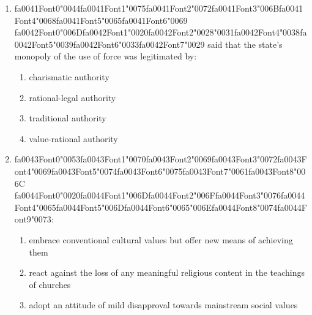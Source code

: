 \documentclass[12pt]{article}
\begin{document}
\begin{enumerate}[label=\arabic*.]
\begin{enumerate}[label=(\alph*)]
    \item the upward curve of remarriages compensates for the drop in first marriages
    \item all of the above
\end{enumerate}
\item {\csname fa0041Font0\endcsname\char"0044}{\csname fa0041Font1\endcsname\char"0075}{\csname fa0041Font2\endcsname\char"0072}{\csname fa0041Font3\endcsname\char"006B}{\csname fa0041Font4\endcsname\char"0068}{\csname fa0041Font5\endcsname\char"0065}{\csname fa0041Font6\endcsname\char"0069} {\csname fa0042Font0\endcsname\char"006D}{\csname fa0042Font1\endcsname\char"0020}{\csname fa0042Font2\endcsname\char"0028}{\char"0031}{\csname fa0042Font4\endcsname\char"0038}{\csname fa0042Font5\endcsname\char"0039}{\csname fa0042Font6\endcsname\char"0033}{\csname fa0042Font7\endcsname\char"0029} said that the state's monopoly of the use of force was legitimated by:
\begin{enumerate}[label=(\alph*)]
    \item charismatic authority
    \item rational-legal authority
    \item traditional authority
    \item value-rational authority
\end{enumerate}
\item {\csname fa0043Font0\endcsname\char"0053}{\csname fa0043Font1\endcsname\char"0070}{\csname fa0043Font2\endcsname\char"0069}{\csname fa0043Font3\endcsname\char"0072}{\csname fa0043Font4\endcsname\char"0069}{\csname fa0043Font5\endcsname\char"0074}{\csname fa0043Font6\endcsname\char"0075}{\csname fa0043Font7\endcsname\char"0061}{\csname fa0043Font8\endcsname\char"006C} {\csname fa0044Font0\endcsname\char"0020}{\csname fa0044Font1\endcsname\char"006D}{\csname fa0044Font2\endcsname\char"006F}{\csname fa0044Font3\endcsname\char"0076}{\csname fa0044Font4\endcsname\char"0065}{\csname fa0044Font5\endcsname\char"006D}{\csname fa0044Font6\endcsname\char"0065}{\char"006E}{\csname fa0044Font8\endcsname\char"0074}{\csname fa0044Font9\endcsname\char"0073}:
\begin{enumerate}[label=(\alph*)]
    \item embrace conventional cultural values but offer new means of achieving them
    \item react against the loss of any meaningful religious content in the teachings of churches
    \item adopt an attitude of mild disapproval towards mainstream social values

\end{enumerate}
\end{enumerate}
\end{document}

